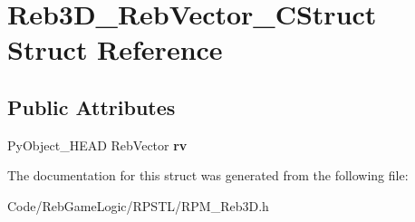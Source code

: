 \hypertarget{struct_reb3_d___reb_vector___c_struct}{}\section{Reb3\+D\+\_\+\+Reb\+Vector\+\_\+\+C\+Struct Struct Reference}
\label{struct_reb3_d___reb_vector___c_struct}
\subsection*{Public Attributes}
\begin{DoxyCompactItemize}
\item 
Py\+Object\+\_\+\+H\+E\+AD Reb\+Vector {\bfseries rv}\hypertarget{struct_reb3_d___reb_vector___c_struct_a37751ccfc25b985c2624fa841343395e}{}\label{struct_reb3_d___reb_vector___c_struct_a37751ccfc25b985c2624fa841343395e}

\end{DoxyCompactItemize}


The documentation for this struct was generated from the following file\+:\begin{DoxyCompactItemize}
\item 
Code/\+Reb\+Game\+Logic/\+R\+P\+S\+T\+L/R\+P\+M\+\_\+\+Reb3\+D.\+h\end{DoxyCompactItemize}
